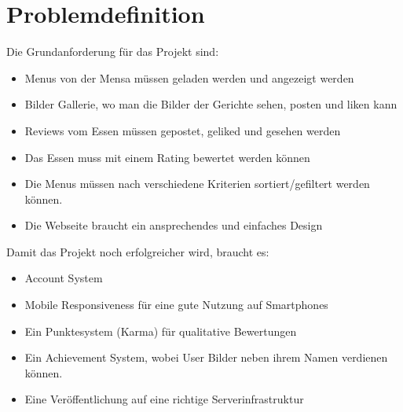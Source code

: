 \section{Problemdefinition}\label{sec:problemdefinition}

Die Grundanforderung für das Projekt sind:
\begin{itemize}
    \item Menus von der Mensa müssen geladen werden und angezeigt werden
    \item Bilder Gallerie, wo man die Bilder der Gerichte sehen, posten und liken kann
    \item Reviews vom Essen müssen gepostet, geliked und gesehen werden
    \item Das Essen muss mit einem Rating bewertet werden können
    \item Die Menus müssen nach verschiedene Kriterien sortiert/gefiltert werden können.
    \item Die Webseite braucht ein ansprechendes und einfaches Design
\end{itemize}

Damit das Projekt noch erfolgreicher wird, braucht es:
\begin{itemize}
    \item Account System
    \item Mobile Responsiveness für eine gute Nutzung auf Smartphones
    \item Ein Punktesystem (Karma) für qualitative Bewertungen
    \item Ein Achievement System, wobei User Bilder neben ihrem Namen verdienen können.
    \item Eine Veröffentlichung auf eine richtige Serverinfrastruktur
\end{itemize}
